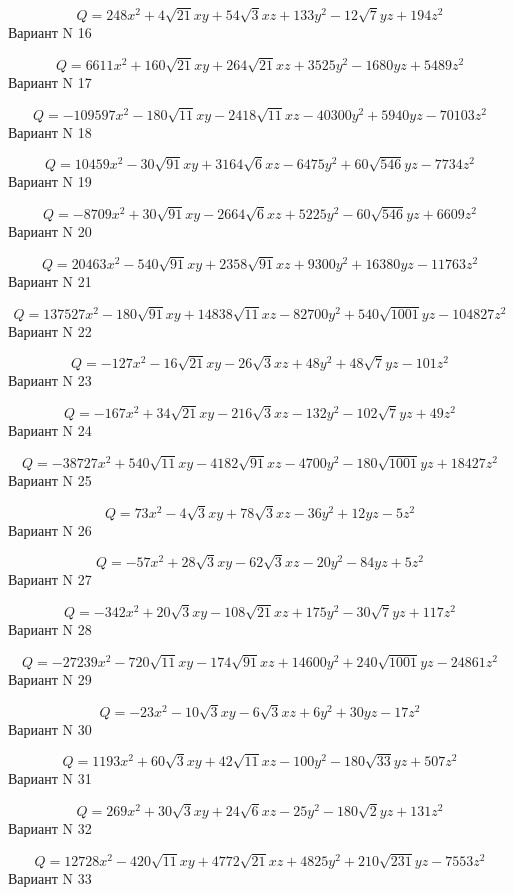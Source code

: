\documentclass[11pt]{report}
\begin{document}
$$Q = 248 x^{2} + 4 \sqrt{21} x y + 54 \sqrt{3} x z + 133 y^{2} - 12 \sqrt{7} y z + 194 z^{2}$$Вариант N 16

$$Q = 6611 x^{2} + 160 \sqrt{21} x y + 264 \sqrt{21} x z + 3525 y^{2} - 1680 y z + 5489 z^{2}$$Вариант N 17

$$Q = - 109597 x^{2} - 180 \sqrt{11} x y - 2418 \sqrt{11} x z - 40300 y^{2} + 5940 y z - 70103 z^{2}$$Вариант N 18

$$Q = 10459 x^{2} - 30 \sqrt{91} x y + 3164 \sqrt{6} x z - 6475 y^{2} + 60 \sqrt{546} y z - 7734 z^{2}$$Вариант N 19

$$Q = - 8709 x^{2} + 30 \sqrt{91} x y - 2664 \sqrt{6} x z + 5225 y^{2} - 60 \sqrt{546} y z + 6609 z^{2}$$Вариант N 20

$$Q = 20463 x^{2} - 540 \sqrt{91} x y + 2358 \sqrt{91} x z + 9300 y^{2} + 16380 y z - 11763 z^{2}$$Вариант N 21

$$Q = 137527 x^{2} - 180 \sqrt{91} x y + 14838 \sqrt{11} x z - 82700 y^{2} + 540 \sqrt{1001} y z - 104827 z^{2}$$Вариант N 22

$$Q = - 127 x^{2} - 16 \sqrt{21} x y - 26 \sqrt{3} x z + 48 y^{2} + 48 \sqrt{7} y z - 101 z^{2}$$Вариант N 23

$$Q = - 167 x^{2} + 34 \sqrt{21} x y - 216 \sqrt{3} x z - 132 y^{2} - 102 \sqrt{7} y z + 49 z^{2}$$Вариант N 24

$$Q = - 38727 x^{2} + 540 \sqrt{11} x y - 4182 \sqrt{91} x z - 4700 y^{2} - 180 \sqrt{1001} y z + 18427 z^{2}$$Вариант N 25

$$Q = 73 x^{2} - 4 \sqrt{3} x y + 78 \sqrt{3} x z - 36 y^{2} + 12 y z - 5 z^{2}$$Вариант N 26

$$Q = - 57 x^{2} + 28 \sqrt{3} x y - 62 \sqrt{3} x z - 20 y^{2} - 84 y z + 5 z^{2}$$Вариант N 27

$$Q = - 342 x^{2} + 20 \sqrt{3} x y - 108 \sqrt{21} x z + 175 y^{2} - 30 \sqrt{7} y z + 117 z^{2}$$Вариант N 28

$$Q = - 27239 x^{2} - 720 \sqrt{11} x y - 174 \sqrt{91} x z + 14600 y^{2} + 240 \sqrt{1001} y z - 24861 z^{2}$$Вариант N 29

$$Q = - 23 x^{2} - 10 \sqrt{3} x y - 6 \sqrt{3} x z + 6 y^{2} + 30 y z - 17 z^{2}$$Вариант N 30

$$Q = 1193 x^{2} + 60 \sqrt{3} x y + 42 \sqrt{11} x z - 100 y^{2} - 180 \sqrt{33} y z + 507 z^{2}$$Вариант N 31

$$Q = 269 x^{2} + 30 \sqrt{3} x y + 24 \sqrt{6} x z - 25 y^{2} - 180 \sqrt{2} y z + 131 z^{2}$$Вариант N 32

$$Q = 12728 x^{2} - 420 \sqrt{11} x y + 4772 \sqrt{21} x z + 4825 y^{2} + 210 \sqrt{231} y z - 7553 z^{2}$$Вариант N 33
\end{document}
